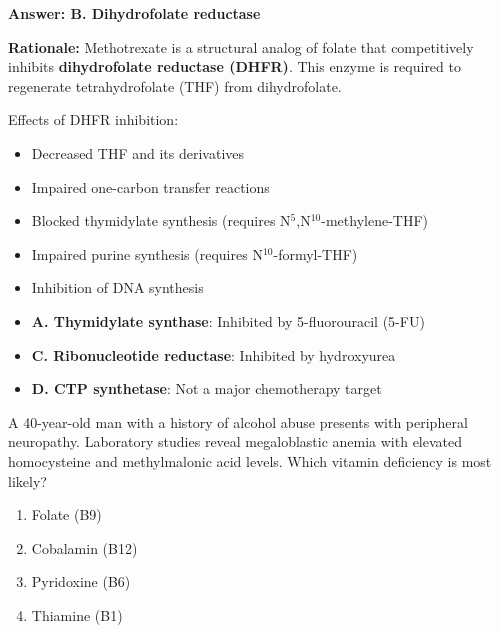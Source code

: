 \begin{solution}
\textbf{Answer: B. Dihydrofolate reductase}

\textbf{Rationale:} Methotrexate is a structural analog of folate that competitively inhibits \textbf{dihydrofolate reductase (DHFR)}. This enzyme is required to regenerate tetrahydrofolate (THF) from dihydrofolate.

Effects of DHFR inhibition:
\begin{itemize}
    \item Decreased THF and its derivatives
    \item Impaired one-carbon transfer reactions
    \item Blocked thymidylate synthesis (requires N$^{5}$,N$^{10}$-methylene-THF)
    \item Impaired purine synthesis (requires N$^{10}$-formyl-THF)
    \item Inhibition of DNA synthesis
\end{itemize}

\begin{itemize}
    \item \textbf{A. Thymidylate synthase}: Inhibited by 5-fluorouracil (5-FU)
    \item \textbf{C. Ribonucleotide reductase}: Inhibited by hydroxyurea
    \item \textbf{D. CTP synthetase}: Not a major chemotherapy target
\end{itemize}
\end{solution}

\begin{exercise}
A 40-year-old man with a history of alcohol abuse presents with peripheral neuropathy. Laboratory studies reveal megaloblastic anemia with elevated homocysteine and methylmalonic acid levels. Which vitamin deficiency is most likely?
\begin{enumerate}[label=\Alph*.]
    \item Folate (B9)
    \item Cobalamin (B12)
    \item Pyridoxine (B6)
    \item Thiamine (B1)
\end{enumerate}
\end{exercise}

